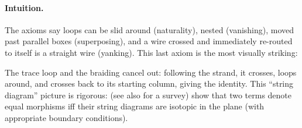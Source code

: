 \documentclass[11pt]{article}
\begin{document}
\paragraph{Intuition.}
The axioms say loops can be slid around (naturality), nested
(vanishing), moved past parallel boxes (superposing), and a wire
crossed and immediately re-routed to itself is a straight wire
(yanking).  This last axiom is the most visually striking:
\begin{center}
\end{center}
The trace loop and the braiding cancel out: following the strand,
it crosses, loops around, and crosses back to its starting column,
giving the identity.  This ``string diagram'' picture is rigorous:
\cite{JSV} (see also \cite{Selinger} for a survey) show that two
terms denote equal morphisms iff their string diagrams are isotopic
in the plane (with appropriate boundary conditions).
\end{document}
